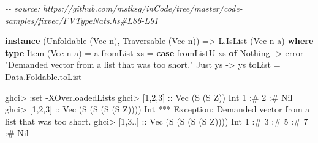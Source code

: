 \documentclass[]{article}
\newenvironment{Shaded}{}{}
\newcommand{\CommentTok}[1]{\textcolor[rgb]{0.38,0.63,0.69}{\textit{#1}}}
\newcommand{\DataTypeTok}[1]{\textcolor[rgb]{0.56,0.13,0.00}{#1}}
\newcommand{\DecValTok}[1]{\textcolor[rgb]{0.25,0.63,0.44}{#1}}
\newcommand{\FunctionTok}[1]{\textcolor[rgb]{0.02,0.16,0.49}{#1}}
\newcommand{\KeywordTok}[1]{\textcolor[rgb]{0.00,0.44,0.13}{\textbf{#1}}}
\newcommand{\NormalTok}[1]{#1}
\newcommand{\OperatorTok}[1]{\textcolor[rgb]{0.40,0.40,0.40}{#1}}
\newcommand{\OtherTok}[1]{\textcolor[rgb]{0.00,0.44,0.13}{#1}}
\newcommand{\StringTok}[1]{\textcolor[rgb]{0.25,0.44,0.63}{#1}}
\begin{document}
\begin{Shaded}
\begin{Highlighting}[]
\CommentTok{{-}{-} source: https://github.com/mstksg/inCode/tree/master/code{-}samples/fixvec/FVTypeNats.hs\#L86{-}L91}

\KeywordTok{instance}\NormalTok{ (}\DataTypeTok{Unfoldable}\NormalTok{ (}\DataTypeTok{Vec}\NormalTok{ n), }\DataTypeTok{Traversable}\NormalTok{ (}\DataTypeTok{Vec}\NormalTok{ n)) }\OtherTok{=\textgreater{}} \DataTypeTok{L.IsList}\NormalTok{ (}\DataTypeTok{Vec}\NormalTok{ n a) }\KeywordTok{where}
    \KeywordTok{type} \DataTypeTok{Item}\NormalTok{ (}\DataTypeTok{Vec}\NormalTok{ n a) }\OtherTok{=}\NormalTok{ a}
\NormalTok{    fromList xs }\OtherTok{=} \KeywordTok{case}\NormalTok{ fromListU xs }\KeywordTok{of}
                    \DataTypeTok{Nothing} \OtherTok{{-}\textgreater{}} \FunctionTok{error} \StringTok{"Demanded vector from a list that was too short."}
                    \DataTypeTok{Just}\NormalTok{ ys }\OtherTok{{-}\textgreater{}}\NormalTok{ ys}
\NormalTok{    toList      }\OtherTok{=}\NormalTok{ Data.Foldable.toList}
\end{Highlighting}
\end{Shaded}

\begin{Shaded}
\begin{Highlighting}[]
\NormalTok{ghci}\OperatorTok{\textgreater{}} \OperatorTok{:}\NormalTok{set }\OperatorTok{{-}}\DataTypeTok{XOverloadedLists}
\NormalTok{ghci}\OperatorTok{\textgreater{}}\NormalTok{ [}\DecValTok{1}\NormalTok{,}\DecValTok{2}\NormalTok{,}\DecValTok{3}\NormalTok{]}\OtherTok{ ::} \DataTypeTok{Vec}\NormalTok{ (}\DataTypeTok{S}\NormalTok{ (}\DataTypeTok{S} \DataTypeTok{Z}\NormalTok{)) }\DataTypeTok{Int}
\DecValTok{1} \OperatorTok{:\#} \DecValTok{2} \OperatorTok{:\#} \DataTypeTok{Nil}
\NormalTok{ghci}\OperatorTok{\textgreater{}}\NormalTok{ [}\DecValTok{1}\NormalTok{,}\DecValTok{2}\NormalTok{,}\DecValTok{3}\NormalTok{]}\OtherTok{ ::} \DataTypeTok{Vec}\NormalTok{ (}\DataTypeTok{S}\NormalTok{ (}\DataTypeTok{S}\NormalTok{ (}\DataTypeTok{S}\NormalTok{ (}\DataTypeTok{S} \DataTypeTok{Z}\NormalTok{)))) }\DataTypeTok{Int}
\OperatorTok{***} \DataTypeTok{Exception}\OperatorTok{:} \DataTypeTok{Demanded}\NormalTok{ vector from a list that was too short}\OperatorTok{.}
\NormalTok{ghci}\OperatorTok{\textgreater{}}\NormalTok{ [}\DecValTok{1}\NormalTok{,}\DecValTok{3}\OperatorTok{..}\NormalTok{]}\OtherTok{ ::} \DataTypeTok{Vec}\NormalTok{ (}\DataTypeTok{S}\NormalTok{ (}\DataTypeTok{S}\NormalTok{ (}\DataTypeTok{S}\NormalTok{ (}\DataTypeTok{S} \DataTypeTok{Z}\NormalTok{)))) }\DataTypeTok{Int}
\DecValTok{1} \OperatorTok{:\#} \DecValTok{3} \OperatorTok{:\#} \DecValTok{5} \OperatorTok{:\#} \DecValTok{7} \OperatorTok{:\#} \DataTypeTok{Nil}
\end{Highlighting}
\end{Shaded}
\end{document}
